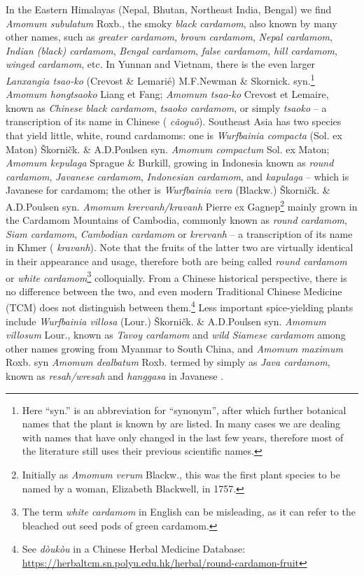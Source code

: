 \documentclass[12pt]{article}
\newcommand{\tc}[1]{\traditionalchinesefont{#1}\rmfamily}
\newcommand{\km}[1]{\khmerfont{#1}\rmfamily}
\newcommand{\jv}[1]{\javanesefont{#1}\rmfamily}
\begin{document}
In the Eastern Himalayas (Nepal, Bhutan, Northeast India, Bengal) we find \textit{Amomum subulatum} Roxb., the smoky \textit{black cardamom}, also known by many other names, such as \textit{greater cardamom}, \textit{brown cardamom}, \textit{Nepal cardamom}, \textit{Indian (black) cardamom}, \textit{Bengal cardamom}, \textit{false cardamom}, \textit{hill cardamom}, \textit{winged cardamom}, etc. In Yunnan and Vietnam, there is the even larger \textit{Lanxangia tsao-ko} (Crevost \& Lemarié) M.F.Newman \& Skornick. syn.\footnote{Here ``syn.'' is an abbreviation for ``synonym'', after which further botanical names that the plant is known by are listed. In many cases we are dealing with names that have only changed in the last few years, therefore most of the literature still uses their previous scientific names.} \textit{Amomum hongtsaoko} Liang et Fang; \textit{Amomum tsao-ko} Crevost et Lemaire, known as \textit{Chinese black cardamom}, \textit{tsaoko cardamom}, or simply \textit{tsaoko} -- a transcription of its name in Chinese (\tc{草果} \textit{cǎoguǒ}). Southeast Asia has two species that yield little, white, round cardamoms: one is \textit{Wurfbainia compacta} (Sol. ex Maton) Škorničk. \& A.D.Poulsen syn. \textit{Amomum compactum} Sol. ex Maton; \textit{Amomum kepulaga} Sprague \& Burkill, growing in Indonesia known as \textit{round cardamom}, \textit{Javanese cardamom}, \textit{Indonesian cardamom}, and \textit{kapulaga} -- which is Javanese for cardamom;
the other is \textit{Wurfbainia vera} (Blackw.) Škorničk. \& A.D.Poulsen syn. \textit{Amomum krervanh/kravanh} Pierre ex Gagnep\footnote{Initially as \textit{Amomum verum} Blackw., this was the first plant species to be named by a woman, Elizabeth Blackwell, in 1757.} mainly grown in the Cardamom Mountains of Cambodia, commonly known as \textit{round cardamom}, \textit{Siam cardamom}, \textit{Cambodian cardamom} or \textit{krervanh} -- a transcription of its name in Khmer (\km{ក្រវាញ} \textit{kravanh}). Note that the fruits of the latter two are virtually identical in their appearance and usage, therefore both are being called \textit{round cardamom} or \textit{white cardamom}\footnote{The term \textit{white cardamom} in English can be misleading, as it can refer to the bleached out seed pods of green cardamom.} colloquially. From a Chinese historical perspective, there is no difference between the two, and even modern Traditional Chinese Medicine (TCM) does not distinguish between them.\footnote{See \textit{dòukòu} in a Chinese Herbal Medicine Database: \url{https://herbaltcm.sn.polyu.edu.hk/herbal/round-cardamon-fruit}} Less important spice-yielding plants include \textit{Wurfbainia villosa} (Lour.) Škorničk. \& A.D.Poulsen syn. \textit{Amomum villosum} Lour., known as \textit{Tavoy cardamom} and \textit{wild Siamese cardamom} among other names growing from Myanmar to South China, and \textit{Amomum maximum}	Roxb. syn \textit{Amomum dealbatum} Roxb. termed by \textcite{vanwyk_2014_culinary} simply as \textit{Java cardamom}, known as \textit{resah/wresah} and \textit{hanggasa} in Javanese \parencite{burkill_1966_dictionary}. 
\end{document}
